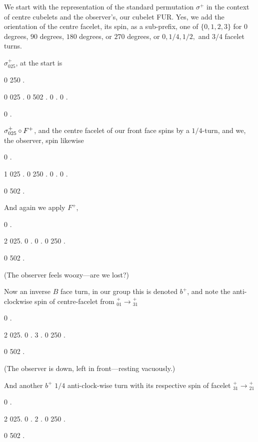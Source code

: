 {{We start with the representation of the
standard permutation $\sigma^+$ in the context of
centre cubelets and the observer's, our cubelet FUR.
Yes, we add the orientation of the centre facelet, its spin,
as a sub-prefix, one of $\{0,1,2,3\}$ for $0$ degrees,
$90$ degrees, $180$ degrees, or $270$ degrees, or
$0,1/4,1/2,$ and $3/4$ facelet turns.

\e $\sigma^+_{025}$, at the start is

\e
{} 0 {} {} 250 {}.\par\thinspace
{} 0 {} 025 {} {}.\qquad{} 0 502 {} {} {}.\qquad
{} 0 {} {} {} {}.\qquad{} 0 {} {} {} {} .\par\thinspace
{} 0 {} {} {} {}.

\vfill\eject
$\sigma^+_{025}\circ F^+$, and the centre facelet of our front face spins
by a $1/4$-turn, and we, the observer, spin likewise

\e
{} 0 {} {} {} {}.\par\thinspace
{} 1 {} {} 025 {}.\qquad{} 0 {} 250 {} {}.\qquad
{} 0 {} {} {} {}.\qquad{} 0 {} {} {} {} .\par\thinspace
{} 0 {} 502 {} {}.

\e And again we apply $F^+$,

\e
{} 0 {} {} {} {}.\par\thinspace
{} 2 {} {} {} 025.\qquad{} 0 {} {} {} {}.\qquad
{} 0 {} {} {} {}.\qquad{} 0 {} {} 250 {} .\par\thinspace
{} 0  502 {} {} {}.

(The observer feels woozy---are we lost?)

\vfill\eject
\e Now an inverse $B$ face turn, in our group this is
denoted $b^+$, and note the anti-clockwise spin of
centre-facelet from ${}_01^+\to{}_31^+$

\e
{} 0 {} {} {} {}.\par\thinspace
{} 2 {} {} {} 025.\qquad{} 0 {} {} {} {}.\qquad
{} 3 {} {} {} {}.\qquad{} 0 {} {} 250 {} .\par\thinspace
{} 0  502 {} {} {}.

(The observer is down, left in front---resting vacuously.)

\e And another $b^+$ $1/4$ anti-clock-wise turn with its respective
spin of facelet ${}_31^+\to{}_21^+$

\e
{} 0 {} {} {} {}.\par\thinspace
{} 2 {} {} {} 025.\qquad{} 0 {} {} {} {}.\qquad
{} 2 {} {} {} {}.\qquad{} 0 {} {} 250 {} .\par\thinspace
{} 0  502 {} {} {}.

}}
